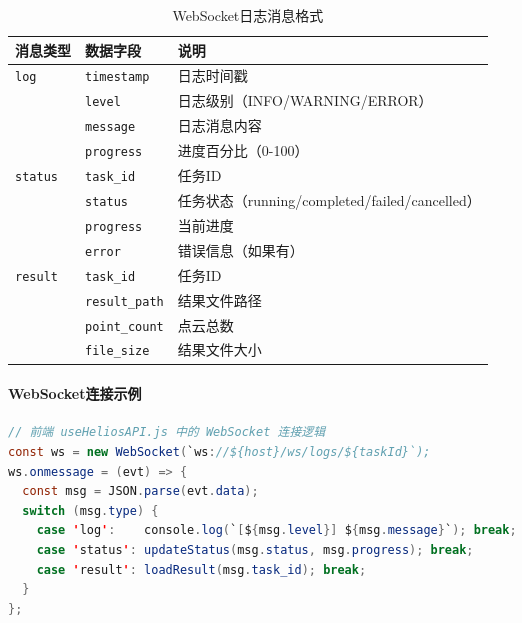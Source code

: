 \documentclass[a4paper,fleqn]{cas-sc}
\begin{document}
\begin{table}[pos=!htbp]
    \centering
    \caption{WebSocket日志消息格式}
    \label{tab:ws-logs}
    \begin{tabular}{@{} lll @{}}
        \toprule
        \textbf{消息类型}   & \textbf{数据字段}         & \textbf{说明}                              \\
        \midrule
        \texttt{log}    & \texttt{timestamp}    & 日志时间戳                                    \\
                        & \texttt{level}        & 日志级别（INFO/WARNING/ERROR）                 \\
                        & \texttt{message}      & 日志消息内容                                   \\
                        & \texttt{progress}     & 进度百分比（0-100）                             \\
        \midrule
        \texttt{status} & \texttt{task\_id}     & 任务ID                                     \\
                        & \texttt{status}       & 任务状态（running/completed/failed/cancelled） \\
                        & \texttt{progress}     & 当前进度                                     \\
                        & \texttt{error}        & 错误信息（如果有）                                \\
        \midrule
        \texttt{result} & \texttt{task\_id}     & 任务ID                                     \\
                        & \texttt{result\_path} & 结果文件路径                                   \\
                        & \texttt{point\_count} & 点云总数                                     \\
                        & \texttt{file\_size}   & 结果文件大小                                   \\
        \bottomrule
    \end{tabular}
\end{table}

\paragraph{WebSocket连接示例}
\begin{lstlisting}[language=Java,caption=WebSocket客户端连接]
// 前端 useHeliosAPI.js 中的 WebSocket 连接逻辑
const ws = new WebSocket(`ws://${host}/ws/logs/${taskId}`);
ws.onmessage = (evt) => {
  const msg = JSON.parse(evt.data);
  switch (msg.type) {
    case 'log':    console.log(`[${msg.level}] ${msg.message}`); break;
    case 'status': updateStatus(msg.status, msg.progress); break;
    case 'result': loadResult(msg.task_id); break;
  }
};
\end{lstlisting}
\end{document}
